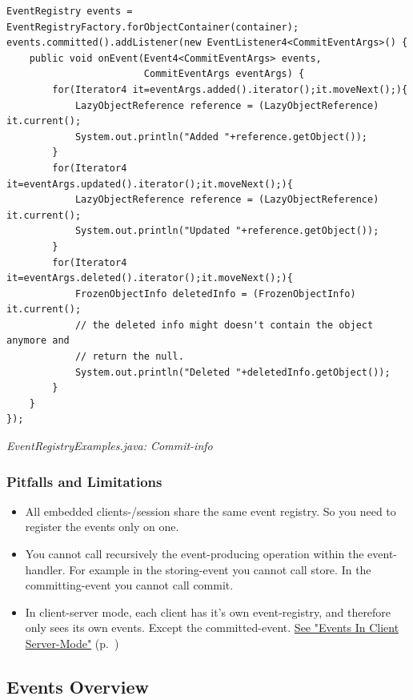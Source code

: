 \begin{lstlisting}
EventRegistry events = EventRegistryFactory.forObjectContainer(container);
events.committed().addListener(new EventListener4<CommitEventArgs>() {
    public void onEvent(Event4<CommitEventArgs> events,
                        CommitEventArgs eventArgs) {
        for(Iterator4 it=eventArgs.added().iterator();it.moveNext();){
            LazyObjectReference reference = (LazyObjectReference) it.current();
            System.out.println("Added "+reference.getObject());
        }
        for(Iterator4 it=eventArgs.updated().iterator();it.moveNext();){
            LazyObjectReference reference = (LazyObjectReference) it.current();
            System.out.println("Updated "+reference.getObject());
        }
        for(Iterator4 it=eventArgs.deleted().iterator();it.moveNext();){
            FrozenObjectInfo deletedInfo = (FrozenObjectInfo) it.current();
            // the deleted info might doesn't contain the object anymore and
            // return the null.
            System.out.println("Deleted "+deletedInfo.getObject());
        }
    }
});
\end{lstlisting}

{\small\itshape EventRegistryExamples.java: Commit-info\par}
\medskip

\subsubsection*{Pitfalls and Limitations}

\begin{itemize}
\item All embedded clients-/session share the same event registry. So you need to register the events only on one.
\item You cannot call recursively the event-producing operation within the event-handler. For example in the storing-event you cannot call store. In the committing-event you cannot call commit.
\item In client-server mode, each client has it's own event-registry, and therefore only sees its own events. Except the committed-event. \hyperref[ref:client-server-events-in-cs-mode]{See "Events In Client Server-Mode"} (p.~\pageref{ref:client-server-events-in-cs-mode})
\end{itemize}

\subsection{Events Overview}
\label{ref:advanced-topics-callbacks-events-overview}

